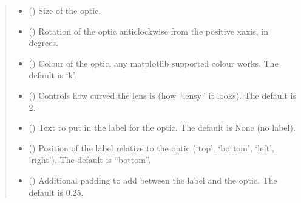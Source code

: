 \documentclass[letterpaper,10pt,english]{sphinxmanual}
\begin{document}
\begin{fulllineitems}
\begin{fulllineitems}
\begin{quote}
\begin{description}
\begin{itemize}
\item {} 
\sphinxAtStartPar
{} () \textendash{} Size of the optic.

\item {} 
\sphinxAtStartPar
{} () \textendash{} Rotation of the optic anticlockwise from the positive x\sphinxhyphen{}axis, in degrees.

\item {} 
\sphinxAtStartPar
{} (\sphinxstyleliteralemphasis{\sphinxupquote{, }}) \textendash{} Colour of the optic, any matplotlib supported colour works. The default is ‘k’.

\item {} 
\sphinxAtStartPar
{} (\sphinxstyleliteralemphasis{\sphinxupquote{, }}) \textendash{} Controls how curved the lens is (how “lens\sphinxhyphen{}y” it looks). The default is 2.

\item {} 
\sphinxAtStartPar
{} (\sphinxstyleliteralemphasis{\sphinxupquote{, }}) \textendash{} Text to put in the label for the optic. The default is None (no label).

\item {} 
\sphinxAtStartPar
{} (\sphinxstyleliteralemphasis{\sphinxupquote{, }}) \textendash{} Position of the label relative to the optic (‘top’, ‘bottom’, ‘left’, ‘right’).
The default is “bottom”.

\item {} 
\sphinxAtStartPar
{} (\sphinxstyleliteralemphasis{\sphinxupquote{, }}) \textendash{} Additional padding to add between the label and the optic. The default is 0.25.


\end{itemize}
\end{description}
\end{quote}
\end{fulllineitems}
\end{fulllineitems}
\end{document}

